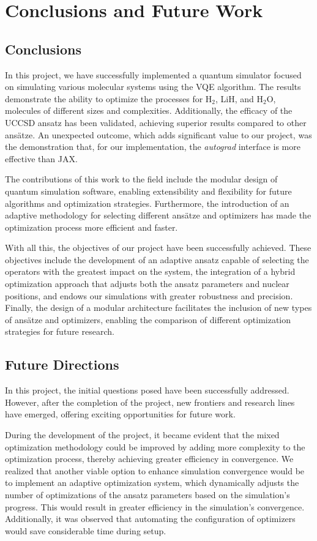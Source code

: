 \chapter{Conclusions and Future Work}

\section{Conclusions}

In this project, we have successfully implemented a quantum simulator focused on simulating various molecular systems using the VQE algorithm. The results demonstrate the ability to optimize the processes for H$_2$, LiH, and H$_2$O, molecules of different sizes and complexities. Additionally, the efficacy of the UCCSD ansatz has been validated, achieving superior results compared to other ansätze. An unexpected outcome, which adds significant value to our project, was the demonstration that, for our implementation, the \textit{autograd} interface is more effective than JAX.

The contributions of this work to the field include the modular design of quantum simulation software, enabling extensibility and flexibility for future algorithms and optimization strategies. Furthermore, the introduction of an adaptive methodology for selecting different ansätze and optimizers has made the optimization process more efficient and faster.

With all this, the objectives of our project have been successfully achieved. These objectives include the development of an adaptive ansatz capable of selecting the operators with the greatest impact on the system, the integration of a hybrid optimization approach that adjusts both the ansatz parameters and nuclear positions, and endows our simulations with greater robustness and precision. Finally, the design of a modular architecture facilitates the inclusion of new types of ansätze and optimizers, enabling the comparison of different optimization strategies for future research.

\section{Future Directions}
In this project, the initial questions posed have been successfully addressed. However, after the completion of the project, new frontiers and research lines have emerged, offering exciting opportunities for future work.

During the development of the project, it became evident that the mixed optimization methodology could be improved by adding more complexity to the optimization process, thereby achieving greater efficiency in convergence. We realized that another viable option to enhance simulation convergence would be to implement an adaptive optimization system, which dynamically adjusts the number of optimizations of the ansatz parameters based on the simulation’s progress. This would result in greater efficiency in the simulation’s convergence. Additionally, it was observed that automating the configuration of optimizers would save considerable time during setup.

